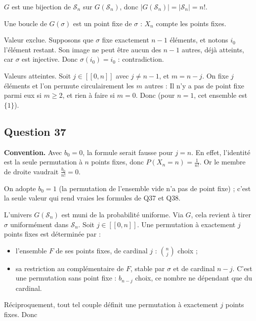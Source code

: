 \documentclass[11pt,a4paper]{article}
\providecommand{\tightlist}{\setlength{\itemsep}{0pt}\setlength{\parskip}{0pt}}
\newcommand{\equationajustee}[1]{%
  \sbox{\boiteequation}{$\displaystyle #1$}%
  \ifdim\wd\boiteequation>\linewidth
    \[\resizebox{\linewidth}{!}{\usebox{\boiteequation}}\]%
  \else
    \[#1\]%
  \fi}
\begin{document}
\(G\) est une bijection de \(\mathcal S_n\) sur \(G(\mathcal S_n)\), donc \(\boxed{|G(\mathcal S_n)|=|\mathcal S_n|=n!}\).

Une boucle de \(G(\sigma)\) est un point fixe de \(\sigma\) : \(X_n\) compte les points fixes.

Valeur exclue. Supposons que \(\sigma\) fixe exactement \(n-1\) éléments, et notons \(i_0\) l'élément restant. Son image ne peut être aucun des \(n-1\) autres, déjà atteints, car \(\sigma\) est injective. Donc \(\sigma(i_0)=i_0\) : contradiction.

Valeurs atteintes. Soit \(j\in[\![0,n]\!]\) avec \(j\neq n-1\), et \(m=n-j\). On fixe \(j\) éléments et l'on permute circulairement les \(m\) autres :
\equationajustee{c_1\to c_2\to\dots\to c_m\to c_1.}
Il n'y a pas de point fixe parmi eux si \(m\ge2\), et rien à faire si \(m=0\). Donc
\equationajustee{\boxed{X_n(\Omega)=[\![0,n]\!]\setminus\{n-1\}}}
(pour \(n=1\), cet ensemble est \(\{1\}\)).

\hypertarget{question-37}{%
\subsection{Question 37}\label{question-37}}

\textbf{Convention.} Avec \(b_0=0\), la formule serait fausse pour \(j=n\). En effet, l'identité est la seule permutation à \(n\) points fixes, donc \(P(X_n=n)=\frac1{n!}\). Or le membre de droite vaudrait \(\frac{b_0}{n!}=0\).

On adopte \(\boxed{b_0=1}\) (la permutation de l'ensemble vide n'a pas de point fixe) ; c'est la seule valeur qui rend vraies les formules de Q37 et Q38.

L'univers \(G(\mathcal S_n)\) est muni de la probabilité uniforme. Via \(G\), cela revient à tirer \(\sigma\) uniformément dans \(\mathcal S_n\). Soit \(j\in[\![0,n]\!]\). Une permutation à exactement \(j\) points fixes est déterminée par :

\begin{itemize}
\tightlist
\item
  l'ensemble \(F\) de ses points fixes, de cardinal \(j\) : \(\binom nj\) choix ;
\item
  sa restriction au complémentaire de \(F\), stable par \(\sigma\) et de cardinal \(n-j\). C'est une permutation sans point fixe : \(b_{n-j}\) choix, ce nombre ne dépendant que du cardinal.
\end{itemize}

Réciproquement, tout tel couple définit une permutation à exactement \(j\) points fixes. Donc
\equationajustee{\boxed{\forall j\in[\![0,n]\!],\ \ P(X_n=j)=\frac{\binom nj\,b_{n-j}}{n!}.}}
\end{document}
